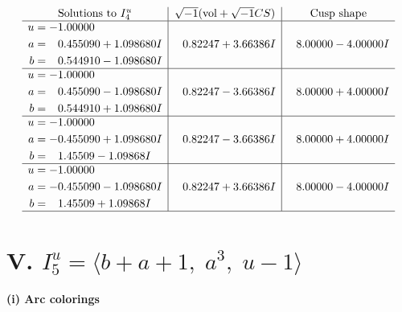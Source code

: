\documentclass[1p]{elsarticle_modified}
\theoremstyle{definition}
\newcommand{\I}{\sqrt{-1}}
\begin{document}
$$\begin{array}{c|c|c}  
\text{Solutions to }I^u_{4}& \I (\text{vol} + \sqrt{-1}CS) & \text{Cusp shape}\\
 \hline 
\begin{aligned}
u &= -1.00000\phantom{ +0.000000I} \\
a &= \phantom{-}0.455090 + 1.098680 I \\
b &= \phantom{-}0.544910 - 1.098680 I\end{aligned}
 & \phantom{-}0.82247 + 3.66386 I & \phantom{-}8.00000 - 4.00000 I \\ \hline\begin{aligned}
u &= -1.00000\phantom{ +0.000000I} \\
a &= \phantom{-}0.455090 - 1.098680 I \\
b &= \phantom{-}0.544910 + 1.098680 I\end{aligned}
 & \phantom{-}0.82247 - 3.66386 I & \phantom{-}8.00000 + 4.00000 I \\ \hline\begin{aligned}
u &= -1.00000\phantom{ +0.000000I} \\
a &= -0.455090 + 1.098680 I \\
b &= \phantom{-}1.45509 - 1.09868 I\end{aligned}
 & \phantom{-}0.82247 - 3.66386 I & \phantom{-}8.00000 + 4.00000 I \\ \hline\begin{aligned}
u &= -1.00000\phantom{ +0.000000I} \\
a &= -0.455090 - 1.098680 I \\
b &= \phantom{-}1.45509 + 1.09868 I\end{aligned}
 & \phantom{-}0.82247 + 3.66386 I & \phantom{-}8.00000 - 4.00000 I\\
 \hline 
 \end{array}$$\newpage\newpage\renewcommand{\arraystretch}{1}
\centering \section*{V. $I^u_{5}= \langle b+a+1,\;a^3,\;u-1 \rangle$}
\flushleft \textbf{(i) Arc colorings}\\
\end{document}
